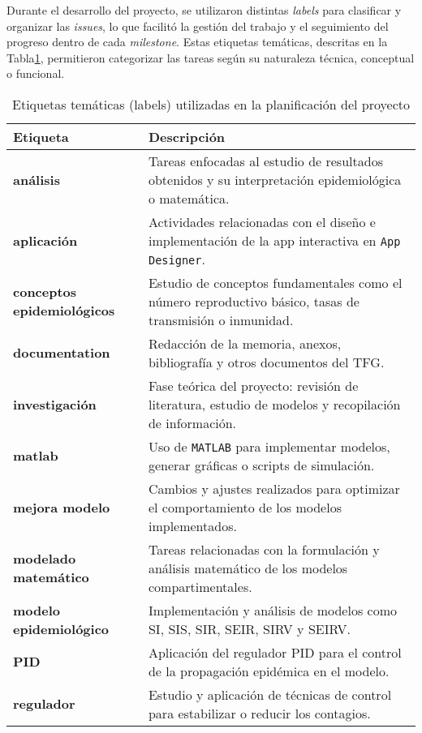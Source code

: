 Durante el desarrollo del proyecto, se utilizaron distintas \textit{labels} para clasificar y organizar las \textit{issues}, lo que facilitó la gestión del trabajo y el seguimiento del progreso dentro de cada \textit{milestone}. Estas etiquetas temáticas, descritas en la Tabla\ref{tab:etiquetas}, permitieron categorizar las tareas según su naturaleza técnica, conceptual o funcional.


\begin{table}[H]
    \centering
    \caption{Etiquetas temáticas (labels) utilizadas en la planificación del proyecto}
    \label{tab:etiquetas}
    \begin{tabular}{|p{4cm}|p{10cm}|}
    \hline
    \textbf{Etiqueta} & \textbf{Descripción} \\
    \hline
    \textbf{análisis} & Tareas enfocadas al estudio de resultados obtenidos y su interpretación epidemiológica o matemática. \\
    \hline
    \textbf{aplicación} & Actividades relacionadas con el diseño e implementación de la app interactiva en \texttt{App Designer}. \\
    \hline
    \textbf{conceptos epidemiológicos} & Estudio de conceptos fundamentales como el número reproductivo básico, tasas de transmisión o inmunidad. \\
    \hline
    \textbf{documentation} & Redacción de la memoria, anexos, bibliografía y otros documentos del TFG. \\
    \hline
    \textbf{investigación} & Fase teórica del proyecto: revisión de literatura, estudio de modelos y recopilación de información. \\
    \hline
    \textbf{matlab} & Uso de \texttt{MATLAB} para implementar modelos, generar gráficas o scripts de simulación. \\
    \hline
    \textbf{mejora modelo} & Cambios y ajustes realizados para optimizar el comportamiento de los modelos implementados. \\
    \hline
    \textbf{modelado matemático} & Tareas relacionadas con la formulación y análisis matemático de los modelos compartimentales. \\
    \hline
    \textbf{modelo epidemiológico} & Implementación y análisis de modelos como SI, SIS, SIR, SEIR, SIRV y SEIRV. \\
    \hline
    \textbf{PID} & Aplicación del regulador PID para el control de la propagación epidémica en el modelo. \\
    \hline
    \textbf{regulador} & Estudio y aplicación de técnicas de control para estabilizar o reducir los contagios. \\

\end{tabular}
\end{table}
